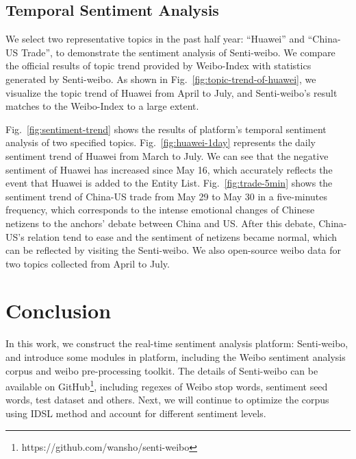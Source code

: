 \documentclass[runningheads]{llncs}
\begin{document}
\subsection{Temporal Sentiment Analysis}

We select two representative topics in the past half year: ``Huawei'' and ``China-US Trade'', to demonstrate the sentiment analysis of Senti-weibo. We compare the official results of topic trend provided by Weibo-Index with statistics generated by Senti-weibo. As shown in Fig.~\ref{fig:topic-trend-of-huawei}, we visualize the topic trend of Huawei from April to July, and Senti-weibo's result matches to the Weibo-Index to a large extent. 

Fig.~\ref{fig:sentiment-trend} shows the results of platform's temporal sentiment analysis of two specified topics. Fig.~\ref{fig:huawei-1day} represents the daily sentiment trend of Huawei from March to July. We can see that the negative sentiment of Huawei has increased since May 16, which accurately reflects the event that Huawei is added to the Entity List. Fig.~\ref{fig:trade-5min} shows the sentiment trend of China-US trade from May 29 to May 30 in a five-minutes frequency, which corresponds to the intense emotional changes of Chinese netizens to the anchors' debate between China and US. After this debate, China-US's relation tend to ease and the sentiment of netizens became normal, which can be reflected by visiting the Senti-weibo. We also open-source weibo data for two topics collected from April to July.

\section{Conclusion}

In this work, we construct the real-time sentiment analysis platform: Senti-weibo, and introduce some modules in platform, including the Weibo sentiment analysis corpus and weibo pre-processing toolkit. The details of Senti-weibo can be available on GitHub\footnote{https://github.com/wansho/senti-weibo}, including regexes of Weibo stop words, sentiment seed words, test dataset and others. Next, we will continue to optimize the corpus using IDSL method and account for different sentiment levels.


%
%
%


\end{document}
